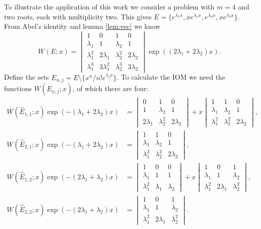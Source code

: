 \documentclass{book}
\begin{document}
To illustrate the application of this work we consider a problem with $m=4$ and two roots, each with multiplicity two.
This gives $E = \{e^{\lambda_1 x}, x e^{\lambda_1 x}, e^{\lambda_2 x}, x e^{\lambda_2 x} \}$.
From Abel's identity and lemma \ref{lem:vec} we know
\begin{equation*}
W(E;x) = \begin{vmatrix} 1 & 0 & 1 & 0 \\ \lambda_1 & 1 & \lambda_2 & 1 \\
\lambda_1^2 & 2 \lambda_1 & \lambda_2^2 & 2 \lambda_2 \\
\lambda_1^3 & 3 \lambda_1^2 & \lambda_2^3 & 3 \lambda_2 \end{vmatrix} \exp \left ( (2 \lambda_1 + 2 \lambda_2 ) x \right ) .
\end{equation*}
Define the sets $\hat{E}_{n,j} = E \setminus \{x^n/n! e^{\lambda_j x}\}$.
To calculate the IOM we need the functions $W(\hat{E}_{n,j};x)$, of which there are four:
\begin{align*}
W(\hat{E}_{1,1} ; x) \exp \left ( -( \lambda_1 + 2 \lambda_2 ) x \right ) & = \begin{vmatrix} 0 & 1 & 0 \\ 1 & \lambda_2 & 1 \\ 2 \lambda_1 & \lambda_2^2 & 2 \lambda_2 \end{vmatrix} + x \begin{vmatrix} 1 & 1 & 0 \\ \lambda_1 & \lambda_2 & 1 \\ \lambda_1^2 & \lambda_2^2 & 2 \lambda_2 \end{vmatrix}, \\
W(\hat{E}_{2,1} ; x) \exp \left ( -( \lambda_1 + 2 \lambda_2 ) x \right )& = \begin{vmatrix} 1 & 1 & 0 \\ \lambda_1 & \lambda_2 & 1 \\ \lambda_1^2 & \lambda_2^2 & 2 \lambda_2 \end{vmatrix}, \\
W(\hat{E}_{1,2} ; x) \exp \left ( -(2 \lambda_1 + \lambda_2 ) x \right )& = \begin{vmatrix} 1 & 0 & 0 \\ \lambda_1 & 1 & 1 \\ \lambda_1^2 & \lambda_1 & \lambda_2 \end{vmatrix} + x \begin{vmatrix} 1 & 0 & 1 \\ \lambda_1 & 1 & \lambda_2 \\ \lambda_1^2 & 2 \lambda_1 & \lambda_2^2 \end{vmatrix}, \\
W(\hat{E}_{2,2} ; x) \exp \left ( -(2 \lambda_1 + \lambda_2 ) x \right )& = \begin{vmatrix} 1 & 0 & 1 \\ \lambda_1 & 1 & \lambda_2 \\ \lambda_1^2 & 2 \lambda_1 & \lambda_2^2 \end{vmatrix} .
\end{align*}
\end{document}
